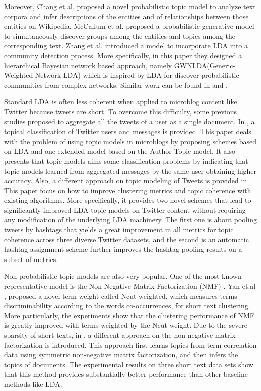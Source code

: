 Moreover, Chang et al. \cite{chang} proposed a novel probabilistic topic model to analyze text corpora and 
infer descriptions of the entities and of relationships between those entities on Wikipedia. McCallum 
et al. \cite{McCallum} proposed a probabilistic generative model to simultaneously discover groups 
among the entities and topics among the corresponding text. Zhang et al. \cite{Zhang} introduced a model 
to incorporate LDA into a community detection process. More specifically, in this paper they designed a 
hierarchical Bayesian network based approach, namely GWNLDA(Generic-Weighted Network-LDA) which is inspired 
by LDA for discover probabilistic communities from complex networks. Similar work can be found in \cite{Liu} 
and \cite{Nallapati}.

Standard LDA is often less coherent when applied to microblog content like Twitter because tweets are short. 
To overcome this difficulty, some previous studies proposed to aggregate all the tweets of a user as a single
document. In \cite{Hong}, a topical classification of Twitter users and messages is provided. This paper 
deals with the problem of using topic models in microblogs by proposing schemes based on LDA 
and one extended model based on the Author-Topic model. It also presents that topic models aims 
some classification problems by indicating that topic models learned from aggregated messages
by the same user obtaining higher accuracy. Also, a different approach on topic modeling of Tweets is provided
in \cite{improving}. This paper focus on how to improve clustering metrics and topic coherence with existing algorithms. More specifically, it provides two novel schemes that lead to significantly improved LDA topic models on Twitter content without requiring any modification of the underlying LDA machinery. The first one is about pooling tweets by hashtags that yields a great improvement in all metrics for topic coherence across three diverse Twitter datasets, and the second is an automatic hashtag assignment scheme further improves the hashtag pooling results on a subset of metrics.


Non-probabilistic topic models are also very popular. One of the most known representative model is the Non-Negative Matrix Factorization (NMF) \cite{paa94,lee99}. Yan et.al \cite{Yan},  proposed a novel term weight called Ncut-weighted, which measures terms discriminability according to the words co-occurrences, for short text clustering. More particularly, the experiments show that the clustering performance of NMF is greatly improved with terms weighted by the Ncut-weight. Due to the severe sparsity of short texts, in \cite{yan2013learning}, a different approach on the non-negative matrix factorization is introduced. This approach first learns topics from term correlation data using symmetric non-negative matrix factorization, and then infers the topics of documents. The experimental results on three short text data sets show that this method provides substantially better performance than other baseline methods like LDA.



